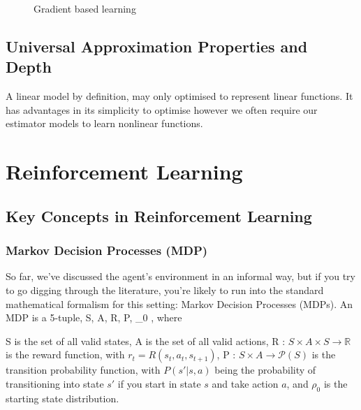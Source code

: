 \begin{figure}[htp]
    \centering
    
    \caption{Gradient based learning}
    \label{fig:gradient-descent}
\end{figure}

\subsection{Universal Approximation Properties and Depth}

A linear model by definition, may only optimised to represent linear functions.
It has advantages in its simplicity to optimise however we often require our
estimator models to learn nonlinear functions.


\newpage{}


\section{Reinforcement Learning\label{ssec:RL}}

\subsection{Key Concepts in Reinforcement Learning}

\subsubsection{Markov Decision Processes (MDP)}

So far, we’ve discussed the agent’s environment in an informal way, but if you
try to go digging through the literature, you’re likely to run into the standard
mathematical formalism for this setting: Markov Decision Processes (MDPs). An
MDP is a 5-tuple, \langle S, A, R, P, \rho_0 \rangle, where

S is the set of all valid states,
A is the set of all valid actions,
R : $S \times A \times S \to \mathbb{R}$ is the reward function, with $r_t = R(s_t, a_t, s_{t+1})$,
P : $S \times A \to \mathcal{P}(S)$ is the transition probability function, with
$P(s'|s,a)$ being the probability of transitioning into state $s'$ if you start
in state $s$ and take action $a$,
and $\rho_0$ is the starting state distribution.

